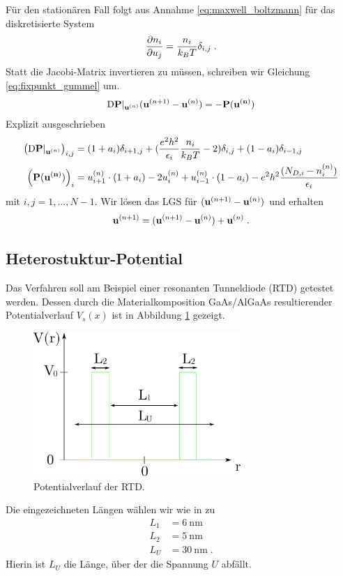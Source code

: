 Für den stationären Fall folgt aus Annahme \eqref{eq:maxwell_boltzmann} für das diskretisierte System
\begin{align}
  \frac{\mathrm{\partial}n_i}{\mathrm{\partial}u_j} = \frac{n_i}{k_B T}\delta_{i,j} \; .
\end{align}
Statt die Jacobi-Matrix invertieren zu müssen, schreiben wir Gleichung \eqref{eq:fixpunkt_gummel} um.
\begin{align}
  \mathrm{D}\vb{P}|_{\vb{u}^{(n)}}(\vb{u}^{(n+1)} - \vb{u}^{(n)}) = -  \vb{P}(\vb{u^{(n)}})
\end{align}
Explizit ausgeschrieben
\begin{align}
  \left(\mathrm{D}\vb{P}|_{\vb{u}^{(n)}}\right)_{i,j} &=
    (1+a_i)\delta_{i+1,j} + ( \frac{e^2h^2}{\epsilon_i}\frac{n_i}{k_B T} - 2) \delta_{i,j} + (1-a_i)\delta_{i-1,j} \\
  \left( \vb{P}(\vb{u^{(n)}}) \right)_{i} &=
   u_{i+1}^{(n)}\cdot(1+a_i) -2 u_i^{(n)} + u_{i-1}^{(n)}\cdot(1-a_i) - e^2h^2\frac{(N_{D,i} - n_i^{(n)})}{\epsilon_i}
\end{align}
mit $i,j = 1,\dots,N-1$. Wir lösen das LGS für $(\vb{u}^{(n+1)} - \vb{u}^{(n)})$ und erhalten
\begin{align}
  \vb{u}^{(n+1)} = (\vb{u}^{(n+1)} - \vb{u}^{(n)}) + \vb{u}^{(n)} \; .
\end{align}

\subsection{Heterostuktur-Potential}
Das Verfahren soll am Beispiel einer resonanten Tunneldiode (RTD) getestet werden. Dessen durch die Materialkomposition GaAs/AlGaAs resultierender Potentialverlauf $V_s(x)$ ist in Abbildung \ref{fig:pot1} gezeigt.
\begin{figure}
  \centering
  \includegraphics[width=0.7\textwidth]{plots/potential.pdf}
  \caption{Potentialverlauf der RTD.}
  \label{fig:pot1}
\end{figure}
Die eingezeichneten Längen wählen wir wie in \cite{lukas1} zu
\begin{align}
  L_1 &= \SI{6}{\nano\meter}\\
  L_2 &= \SI{5}{\nano\meter}\\
  L_U &= \SI{30}{\nano\meter} \; .
\end{align}
Hierin ist $L_U$ die Länge, über der die Spannung $U$ abfällt.



